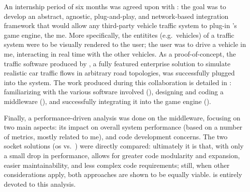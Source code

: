 An internship period of six months was agreed upon with : the goal was to develop an abstract, agnostic, plug-and-play, and network-based integration framework that would allow any third-party vehicle traffic system to plug-in 's game engine, the \gls{me}. More specifically, the entitites (e.g.\ vehicles) of a traffic system were to be visually rendered to the user; the user was to drive a vehicle in \gls{me}, interacting in real time with the other vehicles. As a proof-of-concept, the traffic software produced by , a fully featured enterprise solution to simulate realistic car traffic flows in arbitrary road topologies, was successfully plugged into the system. The work produced during this collaboration is detailed in : familiarizing with the various software involved (), designing and coding a \gls{middleware} (), and successfully integrating it into the game engine ().


Finally, a performance-driven analysis was done on the \gls{middleware}, focusing on two main aspects: its impact on overall system performance (based on a number of metrics, mostly related to \gls{me}), and code development concerns. The two socket solutions (\gls{os} vs.\ ) were directly compared: ultimately it is  that, with only a small drop in performance, allows for greater code modularity and expansion, easier maintainability, and less complex code requirements; still, when other considerations apply, both approaches are shown to be equally viable.  is entirely devoted to this analysis.
